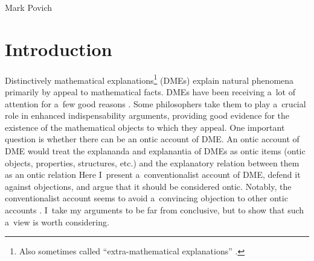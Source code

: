 \begin{artengenv}{Mark Povich}
\section{Introduction}
\lettrine[loversize=0.13,lines=2,lraise=-0.03,nindent=0em,findent=0.2pt]%
{D}{}istinctively mathematical explanations\footnote{Also sometimes called ``extra-mathematical explanations''
\parencites[e.g.,][]{baron_explaining_2016}{baron_counterfactual_2020}.
 } (DMEs) explain natural phenomena primarily by appeal to mathematical facts. DMEs have been receiving a~lot of attention for a~few good reasons 
\parencites[][]{steiner_mathematics_1978}[][]{colyvan_can_1998}[][]{baker_are_2005}[][]{baker_mathematical_2009}
[][]{mancosu_mathematical_2008}
[][]{saatsi_enhanced_2011}[][]{saatsi_mathematics_2012}[][]{saatsi_indispensable_2016}
[][]{lyon_mathematical_2012}
[][]{lange_what_2013}[][]{lange_because_2016}[][]{lange_reply_2018}
[][]{pincock_abstract_2015}[][]{reutlinger_is_2016}[][]{craver_directionality_2017}
[][]{povich_modality_2020}[][]{povich_narrow_2021}. %
 Some philosophers 
\parencites[e.g.,][]{baker_are_2005}[][]{baker_mathematical_2009}[contra][]{bangu_inference_2008}[and][]{saatsi_enhanced_2011}
 take them to play a~crucial role in enhanced indispensability arguments, providing good evidence for the existence of the mathematical objects to which they appeal. One important question is whether there can be an ontic account of DME. An ontic account of DME would treat the explananda and explanantia of DMEs as ontic items (ontic objects, properties, structures, etc.) and the explanatory relation between them as an ontic relation 
\parencites[e.g.,][]{pincock_abstract_2015}{povich_narrow_2021}
 Here I~present a~conventionalist account of DME, defend it against objections, and argue that it should be considered ontic. Notably, the conventionalist account seems to avoid a~convincing objection to other ontic accounts 
\parencite[][]{kuorikoski_there_2021}. %
 I~take my arguments to be far from conclusive, but to show that such a~view is worth considering.


\end{artengenv}
